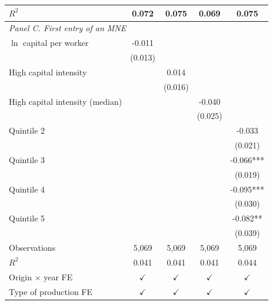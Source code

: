 \begin{tabular}{l*{4}{c}}
$R^2$ & 0.072 & 0.075 & 0.069 & 0.075 \\
\midrule
\multicolumn{5}{l}{\textit{Panel C. First entry of an MNE}} \\
$\ln$ capital per worker & -0.011 &  &  &  \\
 & (0.013) &  &  &  \\
High capital intensity &  & 0.014 &  &  \\
 &  & (0.016) &  &  \\
High capital intensity (median) &  &  & -0.040 &  \\
 &  &  & (0.025) &  \\
Quintile 2 &  &  &  & -0.033 \\
 &  &  &  & (0.021) \\
Quintile 3 &  &  &  & -0.066*** \\
 &  &  &  & (0.019) \\
Quintile 4 &  &  &  & -0.095*** \\
 &  &  &  & (0.030) \\
Quintile 5 &  &  &  & -0.082** \\
 &  &  &  & (0.039) \\
Observations & 5,069 & 5,069 & 5,069 & 5,069 \\
$R^2$ & 0.041 & 0.041 & 0.041 & 0.044 \\
\midrule
Origin $\times$ year FE & $\checkmark$ & $\checkmark$ & $\checkmark$ & $\checkmark$ \\
Type of production FE & $\checkmark$ & $\checkmark$ & $\checkmark$ & $\checkmark$ \\
\bottomrule
\end{tabular}
